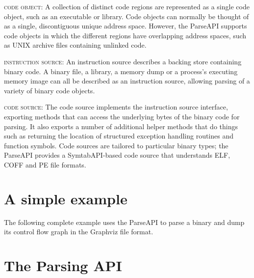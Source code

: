 \documentclass{article}
\begin{document}
%
\begin{itemize}[leftmargin=0pt,label=$\circ$]

{\item {\scshape code object}: A collection of distinct code regions are represented as a single code object, such as an executable or library. Code objects can normally be thought of as a single, discontiguous unique address space. However, the ParseAPI supports code objects in which the different regions have overlapping address spaces, such as UNIX archive files containing unlinked code.
}%

{\item {\scshape instruction source}: An instruction source describes a backing store containing binary code. A binary file, a library, a memory dump or a process's executing memory image can all be described as an instruction source, allowing parsing of a variety of binary code objects.
}%

{\item {\scshape code source}: The code source implements the instruction source interface, exporting methods that can access the underlying bytes of the binary code for parsing. It also exports a number of additional helper methods that do things such as returning the location of structured exception handling routines and function symbols. Code sources are tailored to particular binary types; the ParseAPI provides a SymtabAPI-based code source that understands ELF, COFF and PE file formats.
}%

\end{itemize}

\section{A simple example}
\label{sec:example}

The following complete example uses the ParseAPI to parse a binary and dump its control flow graph in the Graphviz file format.

\lstset{numbers=left, numberstyle=\tiny, stepnumber=5, numbersep=5pt}


\section{The Parsing API}
\label{sec:api}
\end{document}
